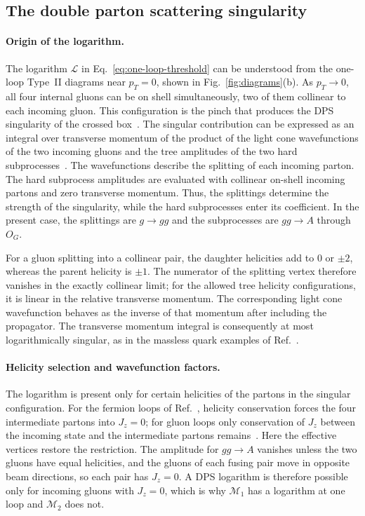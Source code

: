 \subsection{The double parton scattering singularity}
\label{sec:dps}

\paragraph{Origin of the logarithm.}

The logarithm $\mathcal L$ in Eq.~\eqref{eq:one-loop-threshold} can be
understood from the one-loop Type~II diagrams near $p_T=0$, shown in
Fig.~\ref{fig:diagrams}(b). As $p_T\to0$, all four internal gluons can be
on shell simultaneously, two of them collinear to each incoming gluon. This
configuration is the pinch that produces the DPS singularity of the crossed
box~\cite{GauntStirling2011}.
The singular contribution can be expressed as
an integral over transverse momentum of the
product of the light cone wavefunctions of the
two incoming gluons and the tree amplitudes of
the two hard subprocesses~\cite{GauntStirling2011}.
The wavefunctions describe the splitting of each
incoming parton. The hard subprocess amplitudes
are evaluated with collinear on-shell incoming
partons and zero transverse momentum. Thus, the
splittings determine the strength of the
singularity, while the hard subprocesses enter
its coefficient. In the present case, the
splittings are $g\to gg$ and the subprocesses
are $gg\to A$ through $O_G$.

For a gluon splitting into a collinear pair,
the daughter helicities add to $0$ or $\pm2$,
whereas the parent helicity is $\pm1$.
The numerator of the splitting vertex therefore
vanishes in the exactly collinear limit; for the
allowed tree helicity configurations, it
is linear in the relative transverse momentum.
The corresponding light cone wavefunction behaves as the inverse of that momentum after including the propagator.
The transverse momentum integral is consequently at most logarithmically singular, as in the massless quark examples
of Ref.~\cite{GauntStirling2011}.

\paragraph{Helicity selection and wavefunction factors.}

The logarithm is present only for certain helicities of the partons in the
singular configuration. For the fermion loops of
Ref.~\cite{GauntStirling2011}, helicity conservation forces the four
intermediate partons into $J_z=0$; for gluon loops only conservation of
$J_z$ between the incoming state and the intermediate partons
remains~\cite{DixonEsterlis2016,DixonEsterlis2016Erratum}. Here the effective vertices restore the
restriction. The amplitude for $gg\to A$ vanishes unless the two gluons
have equal helicities, and the gluons of each fusing pair move in opposite
beam directions, so each pair has $J_z=0$. A DPS logarithm is therefore
possible only for incoming gluons with $J_z=0$, which is why
$\mathcal M_1$ has a logarithm at one loop and $\mathcal M_2$ does not.

